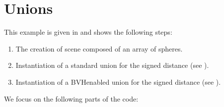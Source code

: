 \documentclass[letterpaper,10pt,english]{sphinxmanual}
\begin{document}
\section{Unions}
\label{\detokenize{Example_Union:unions}}\label{\detokenize{Example_Union:chap-exampleunion}}\label{\detokenize{Example_Union::doc}}
\sphinxAtStartPar
This example is given in  and shows the following steps:
\begin{enumerate}
%
\item {} 
\sphinxAtStartPar
The creation of scene composed of an array of spheres.

\item {} 
\sphinxAtStartPar
Instantiation of a standard union for the signed distance (see {\hyperref[\detokenize{ImplemUnion:chap-union}]{}}).

\item {} 
\sphinxAtStartPar
Instantiation of a BVH\sphinxhyphen{}enabled union for the signed distance (see {\hyperref[\detokenize{ImplemUnion:chap-union}]{}}).

\end{enumerate}

\sphinxAtStartPar
We focus on the following parts of the code:
\end{document}
